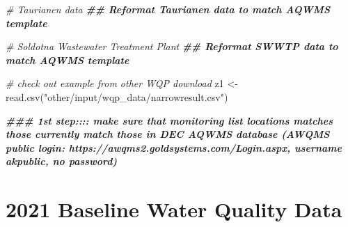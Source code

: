 \documentclass[
]{book}
\newenvironment{Shaded}{\begin{snugshade}}{\end{snugshade}}
\newcommand{\CommentTok}[1]{\textcolor[rgb]{0.56,0.35,0.01}{\textit{#1}}}
\newcommand{\DocumentationTok}[1]{\textcolor[rgb]{0.56,0.35,0.01}{\textbf{\textit{#1}}}}
\newcommand{\FunctionTok}[1]{\textcolor[rgb]{0.00,0.00,0.00}{#1}}
\newcommand{\NormalTok}[1]{#1}
\newcommand{\OtherTok}[1]{\textcolor[rgb]{0.56,0.35,0.01}{#1}}
\newcommand{\StringTok}[1]{\textcolor[rgb]{0.31,0.60,0.02}{#1}}
\begin{document}
\begin{Shaded}
\begin{Highlighting}[]
\CommentTok{\# Taurianen data}
\DocumentationTok{\#\# Reformat Taurianen data to match AQWMS template}
\end{Highlighting}
\end{Shaded}

\begin{Shaded}
\begin{Highlighting}[]
\CommentTok{\# Soldotna Wastewater Treatment Plant}
\DocumentationTok{\#\# Reformat SWWTP data to match AQWMS template}
\end{Highlighting}
\end{Shaded}

\begin{Shaded}
\begin{Highlighting}[]
\CommentTok{\# check out example from other WQP download}
\NormalTok{z1 }\OtherTok{\textless{}{-}} \FunctionTok{read.csv}\NormalTok{(}\StringTok{"other/input/wqp\_data/narrowresult.csv"}\NormalTok{)}

\DocumentationTok{\#\#\# 1st step:::: make sure that monitoring list locations matches those currently match those in DEC AQWMS database (AWQMS public login: https://awqms2.goldsystems.com/Login.aspx, username akpublic, no password)}
\end{Highlighting}
\end{Shaded}

\hypertarget{baseline-water-quality-data}{%
\section{2021 Baseline Water Quality Data}\label{baseline-water-quality-data}}

  
\end{document}
